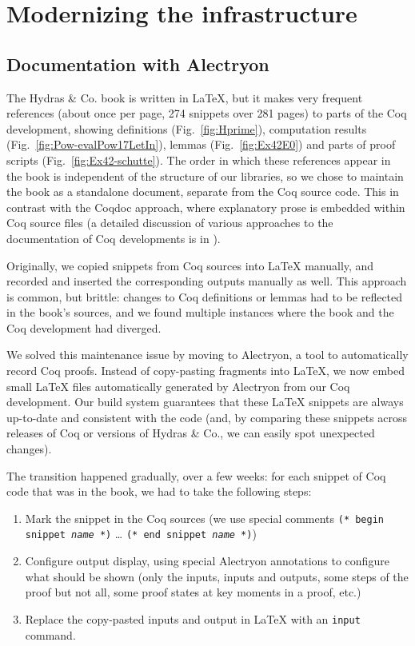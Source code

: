 \documentclass{easychair}
\newcommand{\coq}{Coq\xspace}
\newcommand{\alectr}{Alectryon\xspace}
\newcommand{\Hydras}{Hydras \& Co.\xspace}
\begin{document}
\section{Modernizing the infrastructure}

\subsection{Documentation with \alectr}


The \Hydras book is written in LaTeX, but it makes very frequent references (about once per page, 274 snippets over 281 pages) to parts of the \coq development, showing definitions (Fig.~\ref{fig:Hprime}), computation results (Fig.~\ref{fig:Pow-evalPow17LetIn}), lemmas (Fig.~\ref{fig:Ex42E0}) and parts of  proof scripts (Fig.~\ref{fig:Ex42-schutte}). The order in which these references appear in the book is independent of the structure of our libraries, so we chose to maintain the book as a standalone document, separate from the \coq source code.  This in contrast with the Coqdoc approach, where explanatory prose is embedded within \coq source files (a detailed discussion of various approaches to the documentation of \coq developments is in \cite{alectryonpaper}).

Originally, we copied snippets from \coq sources into LaTeX manually, and recorded and inserted the corresponding outputs manually as well.  This approach is common, but brittle: changes to \coq definitions or lemmas had to be reflected in the book's sources, and we found multiple instances where the book and the \coq development had diverged.
 


We solved this maintenance issue by moving to \alectr, a tool to automatically record \coq proofs.  Instead of copy-pasting fragments into LaTeX, we now embed small LaTeX files automatically generated by \alectr from our \coq development.  Our build system guarantees that these LaTeX snippets are always up-to-date and consistent with the code (and, by comparing these snippets across releases of \coq or versions of \Hydras, we can easily spot unexpected changes).

The transition happened gradually, over a few weeks: for each snippet of \coq code that was in the book, we had to take the following steps:

\begin{enumerate}
\item Mark the snippet in the \coq sources (we use special comments \texttt{(* begin snippet \textit{name} *)} … \texttt{(* end snippet \textit{name} *)})
\item Configure output display, using special \alectr annotations to configure what should be shown (only the inputs, inputs and outputs, some steps of the proof but not all, some proof states at key moments in a proof, etc.)
\item Replace the copy-pasted inputs and output in LaTeX with an \texttt{input} command.
\end{enumerate}
\end{document}
